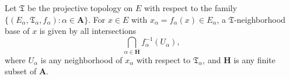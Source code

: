 Let $\mathfrak{T}$ be the projective topology on $E$ with respect to the family $\{(E_\alpha, \mathfrak{T}_\alpha, f_\alpha): \alpha \in \mathbf{A}\}$. For $x \in E$ with $x_\alpha = f_\alpha(x) \in E_\alpha$, a $\mathfrak{T}$-neighborhood base of $x$ is given by all intersections
$$\bigcap_{\alpha \in \mathbf{H}} f_\alpha^{-1}(U_\alpha),$$
where $U_\alpha$ is any neighborhood of $x_\alpha$ with respect to $\mathfrak{T}_\alpha$, and $\mathbf{H}$ is any finite subset of $\mathbf{A}$.
